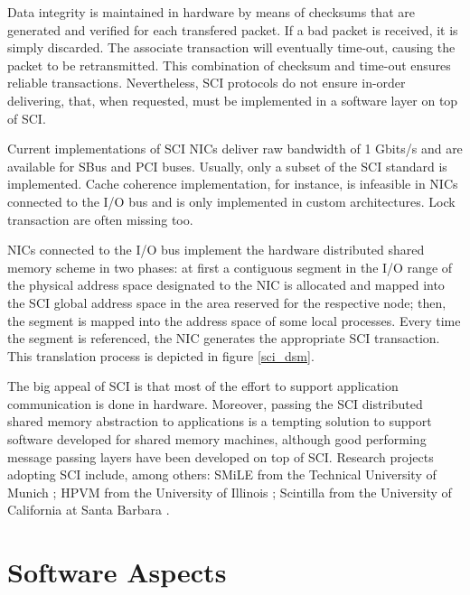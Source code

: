 
	Data integrity is maintained in hardware by means of checksums that are generated and verified for each transfered packet. If a bad packet is received, it is simply discarded. The associate transaction will eventually time-out, causing the packet to be retransmitted. This combination of checksum and time-out ensures reliable transactions. Nevertheless, SCI protocols do not ensure in-order delivering, that, when requested, must be implemented in a software layer on top of SCI.
	
	Current implementations of SCI NICs deliver raw bandwidth of 1 Gbits/s and are available for SBus and PCI buses. Usually, only a subset of the SCI standard is implemented. Cache coherence implementation, for instance, is infeasible in NICs connected to the I/O bus and is only implemented in custom architectures. Lock transaction are often missing too.
	
	NICs connected to the I/O bus implement the hardware distributed shared memory scheme in two phases: at first a contiguous segment in the I/O range of the physical address space designated to the NIC is allocated and mapped into the SCI global address space in the area reserved for the respective node; then, the segment is mapped into the address space of some local processes. Every time the segment is referenced, the NIC generates the appropriate SCI transaction. This translation process is depicted in figure \ref{sci_dsm}.
	

	The big appeal of SCI is that most of the effort to support application communication is done in hardware. Moreover, passing the SCI distributed shared memory abstraction to applications is a tempting solution to support software developed for shared memory machines, although good performing message passing layers have been developed on top of SCI. Research projects adopting SCI include, among others: SMiLE from the Technical University of Munich \cite{Hellwagner:95, Eberl:97}; HPVM from the University of Illinois \cite{Chien:97}; Scintilla from the University of California at Santa Barbara \cite{Ibel:96, Ibel:97}.
	

\section{\label{soft}Software Aspects}

